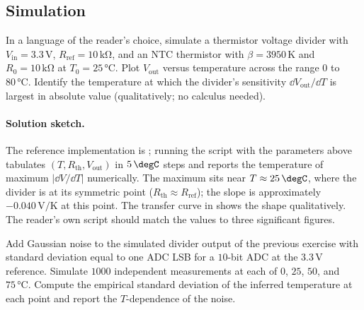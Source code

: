 \subsection*{Simulation}

\begin{exercise}
In a language of the reader's choice, simulate a thermistor voltage
divider with $V_{\text{in}} = 3.3 \,\si{\volt}$,
$R_{\text{ref}} = 10 \,\si{\kilo\ohm}$, and an NTC thermistor with
$\beta = 3950 \,\si{\kelvin}$ and $R_{0} = 10 \,\si{\kilo\ohm}$ at
$T_{0} = 25 \,\si{\degreeCelsius}$. Plot $V_{\text{out}}$ versus
temperature across the range $0$ to $80 \,\si{\degreeCelsius}$.
Identify the temperature at which the divider's sensitivity $\dd
V_{\text{out}} / \dd T$ is largest in absolute value (qualitatively;
no calculus needed).
\end{exercise}

\paragraph{Solution sketch.} The reference implementation is
; running the script with
the parameters above tabulates $(T, R_{\text{th}}, V_{\text{out}})$
in $5 \,\degC$ steps and reports the temperature of maximum
$|\dd V/\dd T|$ numerically. The maximum sits near
$T \approx 25 \,\degC$, where the divider is at its symmetric
point ($R_{\text{th}} \approx R_{\text{ref}}$); the slope is
approximately $-0.040 \,\si{\volt\per\kelvin}$ at this point.
The transfer curve in
 shows the shape
qualitatively. The reader's own script should match the values to
three significant figures.

\begin{exercise}
Add Gaussian noise to the simulated divider output of the previous
exercise with standard deviation equal to one ADC LSB for a
$10$-bit ADC at the $3.3 \,\si{\volt}$ reference. Simulate $1000$
independent measurements at each of $0$, $25$, $50$, and
$75 \,\si{\degreeCelsius}$. Compute the empirical standard
deviation of the inferred temperature at each point and report the
$T$-dependence of the noise.
\end{exercise}

